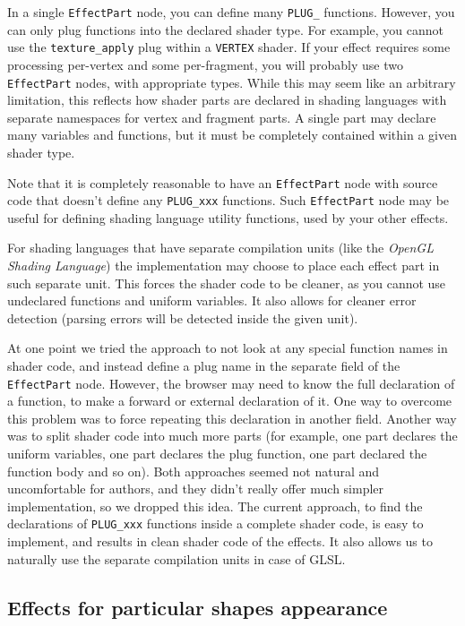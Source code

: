 \documentclass{acmsiggraph}                     %
\begin{document}
In a single \texttt{EffectPart} node, you can define many \texttt{PLUG\_}
functions. However, you can only plug functions into the declared shader
type. For example, you cannot use the \texttt{texture\_apply} plug within
a \texttt{VERTEX} shader.
If your effect requires some processing per-vertex and some per-fragment,
you will probably use two \texttt{EffectPart} nodes, with appropriate types.
While this may seem like an arbitrary limitation,
this reflects how shader parts are declared in shading languages with
separate namespaces for vertex and fragment parts.
A single part may declare many variables and functions,
but it must be completely contained within a given shader type.

Note that it is completely reasonable to have an \texttt{EffectPart} node
with source code that doesn't define any \texttt{PLUG\_xxx} functions.
Such \texttt{EffectPart} node may be useful for defining shading language
utility functions, used by your other effects.

For shading languages that have separate compilation units
(like the \emph{OpenGL Shading Language}) the implementation may choose to place
each effect part in such separate unit. This forces the shader code to be
cleaner, as you cannot use undeclared functions and uniform variables.
It also allows for cleaner error detection (parsing errors will be detected
inside the given unit).

At one point we tried the approach
to not look at any special function names in shader code,
and instead define a plug name in the separate field of the \texttt{EffectPart}
node. However, the browser may need to know the full declaration
of a function, to make a forward or external declaration of it.
One way to overcome this problem was to force repeating this declaration
in another field. Another way was to split shader code into much more
parts (for example, one part declares the uniform variables, one part declares
the plug function, one part declared the function body and so on).
Both approaches seemed not natural and uncomfortable for authors,
and they didn't really offer much simpler implementation, so we dropped this idea.
The current approach, to find the declarations of \texttt{PLUG\_xxx} functions
inside a complete shader code, is easy to implement, and results in clean
shader code of the effects. It also allows us to naturally use
the separate compilation units in case of GLSL.

\subsection{Effects for particular shapes appearance}
\end{document}
